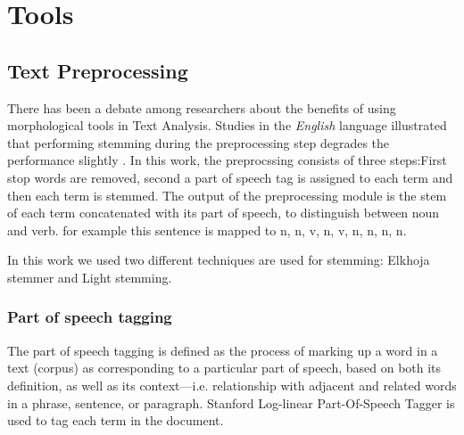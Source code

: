 
\chapter{Tools} %

\label{tools} %


\section{Text Preprocessing}
There has been a debate among researchers about the benefits of using morphological tools in Text Analysis. Studies in the \textit{English}
language illustrated that performing stemming during the preprocessing step degrades the performance slightly \citep{pre_8} \citep{pre_9}. 
In this work, the preprocssing consists of three steps:First stop words are removed, second a part of speech tag is assigned to each term and then each term is stemmed.
The output of the preprocessing module is the stem of each term concatenated with its part of speech, to distinguish between noun and verb. for example this sentence  is mapped to n, n, v, n, v, n, n, n, n.

In this work we used two different techniques are used for stemming: Elkhoja stemmer and Light stemming.

\subsection{Part of speech tagging}

The part of speech tagging is defined as  the process of marking up a word in a text (corpus) as corresponding to a particular part of speech, based on both its definition, as well as its context—i.e. relationship with adjacent and related words in a phrase, sentence, or paragraph. 
Stanford Log-linear Part-Of-Speech Tagger \citep{pre_1} \citep{pre_2} is used to tag each term in the document.


